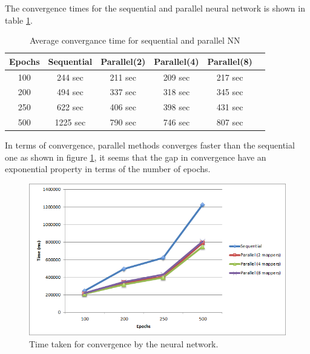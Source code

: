 \documentclass{sig-alternate-05-2015}
\begin{document}
The convergence times for the sequential and parallel neural network is shown in table \ref{mapper_res}.
\begin{table} [h!]
\centering
\caption{Average convergance time for sequential and parallel NN} 
\begin{tabular}{|c|c|c|c|c|c|} \hline
Epochs&Sequential&Parallel(2)&Parallel(4)&Parallel(8)\\ \hline
100&244 sec&211 sec&209 sec&217 sec\\ \hline
200&494 sec&337 sec&318 sec&345 sec \\ \hline
250&622 sec&406 sec&398 sec&431 sec \\ \hline
500&1225 sec&790 sec&746 sec&807 sec \\ \hline
\end{tabular}
\label{mapper_res}
\end{table}

In terms of convergence, parallel methods converges faster than the sequential one as shown in figure \ref{time_NN}, it seems that the gap in convergence have an exponential property in terms of the number of epochs. 
\begin{figure}[h!]
\centering
\includegraphics[width=\columnwidth]{img/time}
\caption{Time taken for convergence by the neural network.}
\label{time_NN}
\end{figure}
\end{document}
